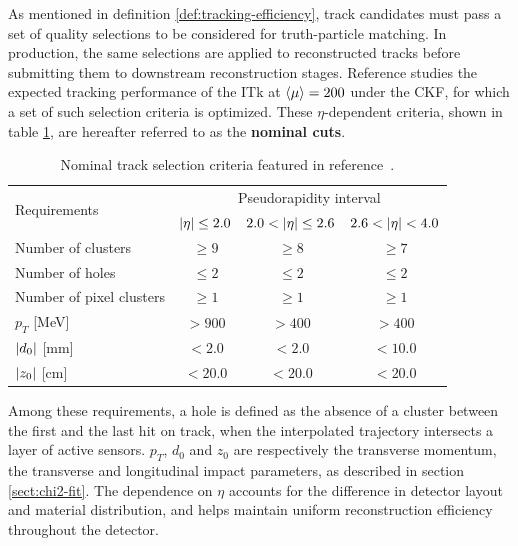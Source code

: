 As mentioned in definition \ref{def:tracking-efficiency}, track candidates must pass a set of quality selections to be considered for truth-particle matching.
In production, the same selections are applied to reconstructed tracks before submitting them to downstream reconstruction stages.
Reference \cite{Aad_2025} studies the expected tracking performance of the ITk at $\expval{\mu}=200$ under the CKF, for which a set of such selection criteria is optimized.
These $\eta$-dependent criteria, shown in table \ref{tab:track-reco-cuts}, are hereafter referred to as the \textbf{nominal cuts}.
\begin{table}[h]
    \centering
    \begin{tabular}{|l|c|c|c|} \hline
       \multirow{2}{*}{Requirements}  & \multicolumn{3}{c|}{Pseudorapidity interval} \\ \cline{2-4}
         & $\abs{\eta} \le 2.0 $ & $2.0< \abs{\eta} \le 2.6$ & $2.6 < \abs{\eta} < 4.0 $ \\ \hline
         Number of clusters & $\ge 9$ & $\ge 8$ & $\ge 7$ \\
         Number of holes & $\le 2$ & $\le 2$ & $\le 2 $ \\
         Number of pixel clusters & $\ge 1$ & $\ge 1$ & $\ge 1$ \\
         $p_T$ [MeV] & $> 900$ & $>400$ & $>400$ \\
         $\abs{d_0}$ [mm] & $< 2.0$ & $<2.0$ & $<10.0$ \\
         $\abs{z_0}$ [cm] & $< 20.0$ & $<20.0$ & $<20.0$ \\
         \hline     
    \end{tabular}
    \caption{Nominal track selection criteria featured in reference~\cite{Aad_2025}.}
    \label{tab:track-reco-cuts}
\end{table}
Among these requirements, a hole is defined as the absence of a cluster between the first and the last hit on track, when the interpolated trajectory intersects a layer of active sensors. 
$p_T$, $d_0$ and $z_0$ are respectively the transverse momentum, the transverse and longitudinal impact parameters, as described in section \ref{sect:chi2-fit}.
The dependence on $\eta$ accounts for the difference in detector layout and material distribution, and helps maintain uniform reconstruction efficiency throughout the detector. 


